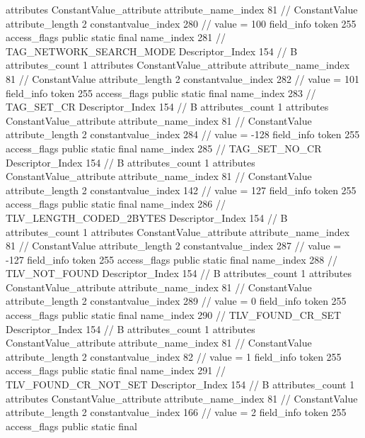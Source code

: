 {{{{{				attributes {
				ConstantValue_attribute {
					attribute_name_index	81		// ConstantValue
					attribute_length	2
					constantvalue_index	280		// value = 100
				}
				}
			}
			field_info {
				token	255
				access_flags	public static final
				name_index	281		// TAG_NETWORK_SEARCH_MODE
				Descriptor_Index	154		// B
				attributes_count	1
				attributes {
				ConstantValue_attribute {
					attribute_name_index	81		// ConstantValue
					attribute_length	2
					constantvalue_index	282		// value = 101
				}
				}
			}
			field_info {
				token	255
				access_flags	public static final
				name_index	283		// TAG_SET_CR
				Descriptor_Index	154		// B
				attributes_count	1
				attributes {
				ConstantValue_attribute {
					attribute_name_index	81		// ConstantValue
					attribute_length	2
					constantvalue_index	284		// value = -128
				}
				}
			}
			field_info {
				token	255
				access_flags	public static final
				name_index	285		// TAG_SET_NO_CR
				Descriptor_Index	154		// B
				attributes_count	1
				attributes {
				ConstantValue_attribute {
					attribute_name_index	81		// ConstantValue
					attribute_length	2
					constantvalue_index	142		// value = 127
				}
				}
			}
			field_info {
				token	255
				access_flags	public static final
				name_index	286		// TLV_LENGTH_CODED_2BYTES
				Descriptor_Index	154		// B
				attributes_count	1
				attributes {
				ConstantValue_attribute {
					attribute_name_index	81		// ConstantValue
					attribute_length	2
					constantvalue_index	287		// value = -127
				}
				}
			}
			field_info {
				token	255
				access_flags	public static final
				name_index	288		// TLV_NOT_FOUND
				Descriptor_Index	154		// B
				attributes_count	1
				attributes {
				ConstantValue_attribute {
					attribute_name_index	81		// ConstantValue
					attribute_length	2
					constantvalue_index	289		// value = 0
				}
				}
			}
			field_info {
				token	255
				access_flags	public static final
				name_index	290		// TLV_FOUND_CR_SET
				Descriptor_Index	154		// B
				attributes_count	1
				attributes {
				ConstantValue_attribute {
					attribute_name_index	81		// ConstantValue
					attribute_length	2
					constantvalue_index	82		// value = 1
				}
				}
			}
			field_info {
				token	255
				access_flags	public static final
				name_index	291		// TLV_FOUND_CR_NOT_SET
				Descriptor_Index	154		// B
				attributes_count	1
				attributes {
				ConstantValue_attribute {
					attribute_name_index	81		// ConstantValue
					attribute_length	2
					constantvalue_index	166		// value = 2
				}
				}
			}
			field_info {
				token	255
				access_flags	public static final
}}}}}
